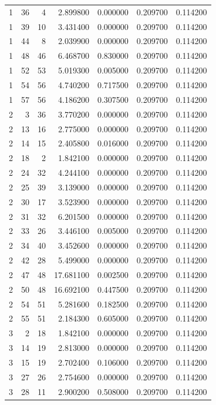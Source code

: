 \begin{table}
\begin{tabular}{rrrrrrr}
1 & 36 & 4 & 2.899800 & 0.000000 & 0.209700 & 0.114200 \\
1 & 39 & 10 & 3.431400 & 0.000000 & 0.209700 & 0.114200 \\
1 & 44 & 8 & 2.039900 & 0.000000 & 0.209700 & 0.114200 \\
1 & 48 & 46 & 6.468700 & 0.830000 & 0.209700 & 0.114200 \\
1 & 52 & 53 & 5.019300 & 0.005000 & 0.209700 & 0.114200 \\
1 & 54 & 56 & 4.740200 & 0.717500 & 0.209700 & 0.114200 \\
1 & 57 & 56 & 4.186200 & 0.307500 & 0.209700 & 0.114200 \\
2 & 3 & 36 & 3.770200 & 0.000000 & 0.209700 & 0.114200 \\
2 & 13 & 16 & 2.775000 & 0.000000 & 0.209700 & 0.114200 \\
2 & 14 & 15 & 2.405800 & 0.016000 & 0.209700 & 0.114200 \\
2 & 18 & 2 & 1.842100 & 0.000000 & 0.209700 & 0.114200 \\
2 & 24 & 32 & 4.244100 & 0.000000 & 0.209700 & 0.114200 \\
2 & 25 & 39 & 3.139000 & 0.000000 & 0.209700 & 0.114200 \\
2 & 30 & 17 & 3.523900 & 0.000000 & 0.209700 & 0.114200 \\
2 & 31 & 32 & 6.201500 & 0.000000 & 0.209700 & 0.114200 \\
2 & 33 & 26 & 3.446100 & 0.005000 & 0.209700 & 0.114200 \\
2 & 34 & 40 & 3.452600 & 0.000000 & 0.209700 & 0.114200 \\
2 & 42 & 28 & 5.499000 & 0.000000 & 0.209700 & 0.114200 \\
2 & 47 & 48 & 17.681100 & 0.002500 & 0.209700 & 0.114200 \\
2 & 50 & 48 & 16.692100 & 0.447500 & 0.209700 & 0.114200 \\
2 & 54 & 51 & 5.281600 & 0.182500 & 0.209700 & 0.114200 \\
2 & 55 & 51 & 2.184300 & 0.605000 & 0.209700 & 0.114200 \\
3 & 2 & 18 & 1.842100 & 0.000000 & 0.209700 & 0.114200 \\
3 & 14 & 19 & 2.813000 & 0.000000 & 0.209700 & 0.114200 \\
3 & 15 & 19 & 2.702400 & 0.106000 & 0.209700 & 0.114200 \\
3 & 27 & 26 & 2.754600 & 0.000000 & 0.209700 & 0.114200 \\
3 & 28 & 11 & 2.900200 & 0.508000 & 0.209700 & 0.114200 \\

\end{tabular}
\end{table}
